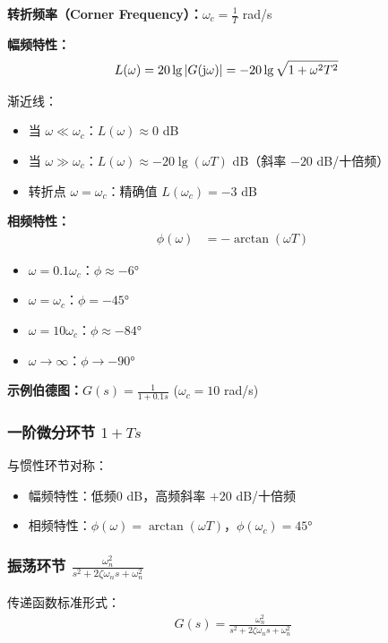 \textbf{转折频率（Corner Frequency）：}$\omega_c = \frac{1}{T}$ rad/s

\textbf{幅频特性：}
\begin{align*}
L(\omega) &= 20\lg|G(\mathrm{j}\omega)| = -20\lg\sqrt{1 + \omega^2T^2}
\end{align*}

渐近线：
\begin{itemize}
    \item 当 $\omega \ll \omega_c$：$L(\omega) \approx 0$ dB
    \item 当 $\omega \gg \omega_c$：$L(\omega) \approx -20\lg(\omega T)$ dB（斜率 $-20$ dB/十倍频）
    \item 转折点 $\omega = \omega_c$：精确值 $L(\omega_c) = -3$ dB
\end{itemize}

\textbf{相频特性：}
\begin{align*}
\phi(\omega) &= -\arctan(\omega T)
\end{align*}
\begin{itemize}
    \item $\omega = 0.1\omega_c$：$\phi \approx -6°$
    \item $\omega = \omega_c$：$\phi = -45°$
    \item $\omega = 10\omega_c$：$\phi \approx -84°$
    \item $\omega \to \infty$：$\phi \to -90°$
\end{itemize}

\textbf{示例伯德图：}$G(s) = \frac{1}{1+0.1s}$ ($\omega_c = 10$ rad/s)
\begin{center}
\end{center}

\subsubsection{一阶微分环节 $1+Ts$}
与惯性环节对称：
\begin{itemize}
    \item 幅频特性：低频0 dB，高频斜率 $+20$ dB/十倍频
    \item 相频特性：$\phi(\omega) = \arctan(\omega T)$，$\phi(\omega_c) = 45°$
\end{itemize}

\subsubsection{振荡环节 $\frac{\omega_n^2}{s^2 + 2\zeta\omega_n s + \omega_n^2}$}
传递函数标准形式：
\begin{align*}
G(s) = \frac{\omega_n^2}{s^2 + 2\zeta\omega_n s + \omega_n^2}
\end{align*}

